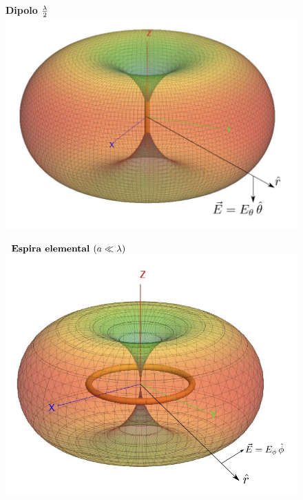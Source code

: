 \documentclass[twocolumn, 8pt]{extarticle}
\begin{document}
\begin{multicols}{2}
	\begin{figure}[H]
		\centering
		\textbf{Dipolo }\( \frac{\lambda}{2} \vspace{0.5cm} \)
		\includegraphics[width=\columnwidth]{diagrama_dipolo.png}
	\end{figure}

	\begin{figure}[H]
		\centering
		\(\textbf{ Espira elemental } \newline (a \ll \lambda) \)
		\includegraphics[width=\columnwidth]{espira_elemental.png}
	\end{figure}
\end{multicols}
\end{document}

